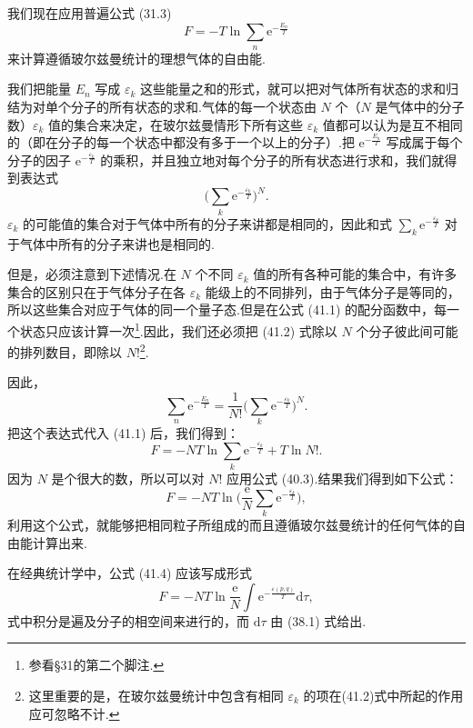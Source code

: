 我们现在应用普遍公式 (31.3)
\begin{equation}
  F=-T\ln\sum_n\mathrm{e}^{-\frac{E_n}{T}}
\end{equation}
来计算遵循玻尔兹曼统计的理想气体的自由能.

我们把能量 $E_n$ 写成 $\varepsilon_k$ 这些能量之和的形式，就可以把对气体所有状态的求和归结为对单个分子的所有状态的求和.气体的每一个状态由 $N$ 个（$N$ 是气体中的分子数）$\varepsilon_k$ 值的集合来决定，在玻尔兹曼情形下所有这些 $\varepsilon_k$ 值都可以认为是互不相同的（即在分子的每一个状态中都没有多于一个以上的分子）.把 $\mathrm{e}^{-\frac{E_n}{T}}$ 写成属于每个分子的因子 $\mathrm{e}^{-\frac{\varepsilon_k}{T}}$ 的乘积，并且独立地对每个分子的所有状态进行求和，我们就得到表达式
\begin{equation}
  \Big(\sum_k\mathrm{e}^{-\frac{\varepsilon_k}{T}}\Big)^{N}.
\end{equation}
$\varepsilon_k$ 的可能值的集合对于气体中所有的分子来讲都是相同的，因此和式 $\sum_k\mathrm{e}^{-\frac{\varepsilon_k}{T}}$ 对于气体中所有的分子来讲也是相同的.

但是，必须注意到下述情况.在 $N$ 个不同 $\varepsilon_k$ 值的所有各种可能的集合中，有许多集合的区别只在于气体分子在各 $\varepsilon_k$ 能级上的不同排列，由于气体分子是等同的，所以这些集合对应于气体的同一个量子态.但是在公式 (41.1) 的配分函数中，每一个状态只应该计算一次\footnote{参看§31的第二个脚注.}.因此，我们还必须把 (41.2) 式除以 $N$ 个分子彼此间可能的排列数目，即除以 $N!$\footnote{这里重要的是，在玻尔兹曼统计中包含有相同 $\varepsilon_k$ 的项在(41.2)式中所起的作用应可忽略不计.}.

因此，
\begin{equation}
  \sum_n\mathrm{e}^{-\frac{E_n}{T}}
  =\frac{1}{N!}\Big(\sum_k\mathrm{e}^{-\frac{\varepsilon_k}{T}}\Big)^{N}.
\end{equation}
把这个表达式代入 (41.1) 后，我们得到：
\begin{equation*}
  F=-NT\ln\sum_k\mathrm{e}^{-\frac{\varepsilon_k}{T}}+T\ln N!.
\end{equation*}
因为 $N$ 是个很大的数，所以可以对 $N!$ 应用公式 (40.3).结果我们得到如下公式：
\begin{equation}
  F=-NT\ln\Big(\frac{\mathrm{e}}{N}\sum_k\mathrm{e}^{-\frac{\varepsilon_k}{T}}\Big),
\end{equation}
利用这个公式，就能够把相同粒子所组成的而且遵循玻尔兹曼统计的任何气体的自由能计算出来.

在经典统计学中，公式 (41.4) 应该写成形式
\begin{equation}
  F=-NT\ln\frac{\mathrm{e}}{N}\int\mathrm{e}^{-\frac{\varepsilon(p,q)}{T}}\mathrm{d}\tau,
\end{equation}
式中积分是遍及分子的相空间来进行的，而 $\mathrm{d}\tau$ 由 (38.1) 式给出.

